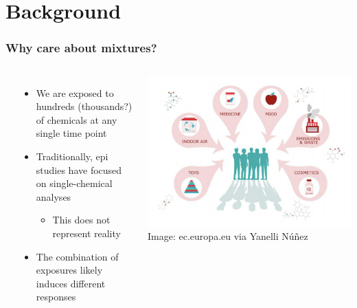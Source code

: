 \setlength{\parskip}{\baselineskip} 
\section{Background}

\frame
{\frametitle{ Why care about mixtures? }
\begin{columns}
\vspace{2ex} \\
    \begin{itemize}
        \item We are exposed to hundreds (thousands?) of chemicals at any single time point
        \item Traditionally, epi studies have focused on single-chemical analyses
        \begin{itemize}
            \item This does not represent reality
        \end{itemize}
        \item The {\color{matbluedark} combination} of exposures likely induces different responses 
    \end{itemize}
\begin{center}
	\includegraphics[scale=0.3]{figures/europa_image.png} \\
\raggedleft
	{\tiny\color{hgray}Image: ec.europa.eu via Yanelli N\'{u}\~{n}ez}
\end{center}
\end{columns}
}

